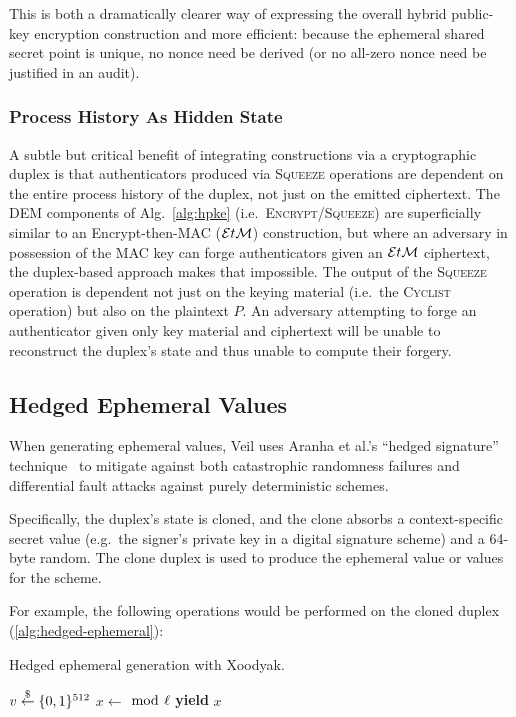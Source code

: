 This is both a dramatically clearer way of expressing the overall hybrid public-key encryption construction and more
efficient: because the ephemeral shared secret point is unique, no nonce need be derived (or no all-zero nonce need be
justified in an audit).

\subsubsection{Process History As Hidden State}

A subtle but critical benefit of integrating constructions via a cryptographic duplex is that authenticators produced
via \textsc{Squeeze} operations are dependent on the entire process history of the duplex, not just on the emitted
ciphertext.
The DEM components of Alg.~\ref{alg:hpke} (i.e.\ \textsc{Encrypt}/\textsc{Squeeze}) are superficially similar to an
Encrypt-then-MAC ($\mathcal{E}t\mathcal{M}$) construction, but where an adversary in possession of the MAC key can forge authenticators
given an $\mathcal{E}t\mathcal{M}$ ciphertext, the duplex-based approach makes that impossible.
The output of the \textsc{Squeeze} operation is dependent not just on the keying material (i.e.\ the \textsc{Cyclist}
operation) but also on the plaintext $P$.
An adversary attempting to forge an authenticator given only key material and ciphertext will be unable to reconstruct
the duplex's state and thus unable to compute their forgery.

\subsection{Hedged Ephemeral Values}\label{subsec:cons-hedged-ephemeral-values}

When generating ephemeral values, Veil uses Aranha et al.'s ``hedged signature'' technique~\cite{aranha2020} to mitigate
against both catastrophic randomness failures and differential fault attacks against purely deterministic schemes.

Specifically, the duplex's state is cloned, and the clone absorbs a context-specific secret value (e.g.\ the signer's
private key in a digital signature scheme) and a 64-byte random.
The clone duplex is used to produce the ephemeral value or values for the scheme.

For example, the following operations would be performed on the cloned duplex (\ref{alg:hedged-ephemeral}):

\begin{algorithm}[ht]
    \caption{Hedged ephemeral generation with Xoodyak.}
    \begin{algorithmic}[0]
        \Clone {}
        \State {}
        \State $v \stackrel{\$}{\gets} \{0,1\}^{512}$
        \State {}
        \State $x \gets$  $\bmod~\ell$
        \State \textbf{yield} $x$
        \End
    \end{algorithmic}
    \label{alg:hedged-ephemeral}
\end{algorithm}

